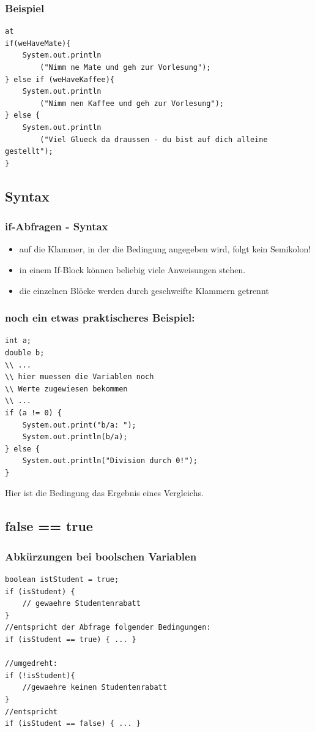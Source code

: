 \documentclass[final]{beamer}
\begin{document}
\begin{frame}[containsverbatim]
	\frametitle{Beispiel}
	\begin{lstlisting}at
if(weHaveMate){
	System.out.println
		("Nimm ne Mate und geh zur Vorlesung");
} else if (weHaveKaffee){
	System.out.println
		("Nimm nen Kaffee und geh zur Vorlesung");
} else {
	System.out.println
		("Viel Glueck da draussen - du bist auf dich alleine gestellt");
}
	\end{lstlisting}
\end{frame}

\subsection{Syntax}
\begin{frame}
	\frametitle{if-Abfragen - Syntax}
	\begin{itemize}
		\item{auf die Klammer, in der die Bedingung angegeben wird, folgt kein Semikolon!}
		\item{in einem If-Block können beliebig viele Anweisungen stehen.}
		\item{die einzelnen Blöcke werden durch geschweifte Klammern getrennt}
	\end{itemize}
\end{frame}

\begin{frame}[containsverbatim]
	\frametitle{noch ein etwas praktischeres Beispiel:}
	\begin{lstlisting}
int a;
double b;
\\ ...
\\ hier muessen die Variablen noch
\\ Werte zugewiesen bekommen
\\ ...
if (a != 0) {
	System.out.print("b/a: ");
	System.out.println(b/a);
} else {
	System.out.println("Division durch 0!");
}
	\end{lstlisting}
	Hier ist die Bedingung das Ergebnis eines Vergleichs.
\end{frame}

\subsection{false == true}
\begin{frame}[containsverbatim]
	\frametitle{Abkürzungen bei boolschen Variablen}
	\begin{lstlisting}
boolean istStudent = true;
if (isStudent) {
	// gewaehre Studentenrabatt
}
//entspricht der Abfrage folgender Bedingungen:
if (isStudent == true) { ... }

//umgedreht:
if (!isStudent){
	//gewaehre keinen Studentenrabatt
}
//entspricht
if (isStudent == false) { ... }
	\end{lstlisting}
\end{frame}
\end{document}
